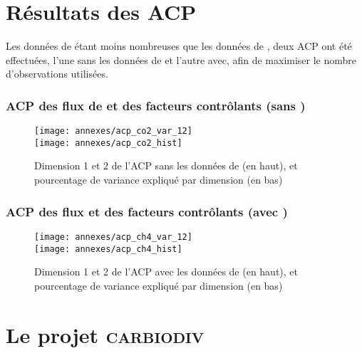 \clearpage

\section{Résultats des ACP}
\label{sec:acp}

Les données de \chh étant moins nombreuses que les données de \coo, deux ACP ont été effectuées, l'une sans les données de \chh et l'autre avec, afin de maximiser le nombre d'observations utilisées.

\subsubsection{ACP des flux de \coo et des facteurs contrôlants (sans \chh)}

\begin{figure}[H]
\centering
\texttt{[image: annexes/acp\_co2\_var\_12]}\\
\texttt{[image: annexes/acp\_co2\_hist]}
\caption{Dimension 1 et 2 de l'ACP sans les données de \chh (en haut), et pourcentage de variance expliqué par dimension (en bas)}
\label{fig:acp_co2}
\end{figure}

\clearpage
\subsubsection{ACP des flux et des facteurs contrôlants (avec \chh)}

\begin{figure}[H]
\centering
\texttt{[image: annexes/acp\_ch4\_var\_12]}\\
\texttt{[image: annexes/acp\_ch4\_hist]}
\caption{Dimension 1 et 2 de l'ACP avec les données de \chh (en haut), et pourcentage de variance expliqué par dimension (en bas)}
\label{fig:acp_ch4}
\end{figure}






\clearpage
\section{Le projet \textsc{carbiodiv}}
\label{sec:carbiodiv}

